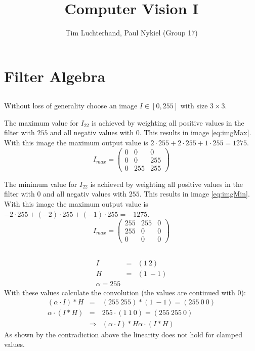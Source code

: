 \documentclass[DIN, pagenumber=false, fontsize=11pt, parskip=half]{scrartcl}
\title{Computer Vision I}
\author{Tim Luchterhand, Paul Nykiel (Group 17)}
\begin{document}
    \maketitle
    \section{Filter Algebra}
    \subsection{}
    Without loss of generality choose an image $I \in [0,255]$ with size $3 \times 3$. 
    
    The maximum value for $I_{22}$ is achieved by weighting all positive values in the filter with $255$ and all negativ values with $0$. This results in image \eqref{eq:imgMax}. With this image the maximum output value is $2 \cdot 255 + 2 \cdot 255 + 1 \cdot 255 = 1275$.
    \begin{equation}
        \label{eq:imgMax}
        I_{max} = \begin{pmatrix}
            0 & 0 & 0 \\
            0 & 0 & 255 \\
            0 & 255 & 255
        \end{pmatrix}
    \end{equation}
    
    The minimum value for $I_{22}$ is achieved by weighting all positive values in the filter with $0$ and all negativ values with $255$. This results in image \eqref{eq:imgMin}. With this image the maximum output value is $-2 \cdot 255 + (-2) \cdot 255 + (-1) \cdot 255 = -1275$.
    \begin{equation}
        \label{eq:imgMin}
        I_{max} = \begin{pmatrix}
            255 & 255 & 0 \\
            255 & 0 & 0 \\
            0 & 0 & 0
        \end{pmatrix}
    \end{equation}

    \subsection{}
    \begin{eqnarray*}
        I &=& (1\ 2) \\
        H &=& (1\ -1) \\
        \alpha = 255
    \end{eqnarray*}
    With these values calculate the convolution (the values are continued with $0$):
    \begin{eqnarray*}
        (\alpha \cdot I) * H &=& 
        (255\ 255) * (1\ -1) =
        (255\ 0\ 0) \\
        \alpha \cdot (I * H) &=&
        255 \cdot (1\ 1\ 0) =
        (255\ 255\ 0) \\
        &\Rightarrow& (\alpha \cdot I) * H  \alpha \cdot (I * H)
    \end{eqnarray*}
    As shown by the contradiction above the linearity does not hold for clamped values.
\end{document}
